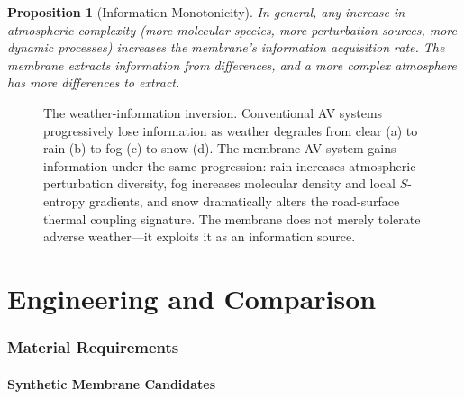 \documentclass[12pt]{article}
\newtheorem{proposition}[theorem]{Proposition}
\theoremstyle{definition}
\theoremstyle{remark}
\begin{document}
\begin{proposition}[Information Monotonicity]
\label{prop:info_monotone}
In general, any increase in atmospheric complexity (more molecular species, more perturbation sources, more dynamic processes) increases the membrane's information acquisition rate. The membrane extracts information from \emph{differences}, and a more complex atmosphere has more differences to extract.
\end{proposition}

\begin{figure}[H]
\centering
{}
\caption{The weather-information inversion. Conventional AV systems progressively lose information as weather degrades from clear (a) to rain (b) to fog (c) to snow (d). The membrane AV system gains information under the same progression: rain increases atmospheric perturbation diversity, fog increases molecular density and local $S$-entropy gradients, and snow dramatically alters the road-surface thermal coupling signature. The membrane does not merely tolerate adverse weather---it exploits it as an information source.}
\label{fig:weather_inversion}
\end{figure}


\part{Engineering and Comparison}
\label{part:engineering}

\section{Material Requirements}
\label{sec:materials}

\subsection{Synthetic Membrane Candidates}
\end{document}
